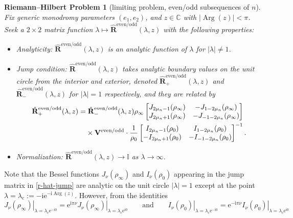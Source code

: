\documentclass[11pt]{article}
\numberwithin{equation}{section}
\numberwithin{equation}{section}
\newtheorem{rhp}[Theorem]{Riemann--Hilbert Problem}
\newcommand{\ee}{\mathrm{e}}
\newcommand{\ii}{\mathrm{i}}
\renewcommand{\arg}{\operatorname{Arg}}
\begin{document}
\begin{rhp}[limiting problem, even/odd subsequences of $n$]
Fix generic monodromy parameters $( e_1, e_2)$, and $z\in\mathbb{C}$ with $|{\arg}(z)|<\pi$. Seek a $2\times 2$ matrix function $\lambda\mapsto\hat{\mathbf{R}}^\mathrm{even/odd}(\lambda,z)$ with the following properties:
\begin{itemize}\itemsep=0pt
 \item Analyticity: $\hat{\mathbf{R}}^\mathrm{even/odd}(\lambda,z)$ is an analytic function of $\lambda$ for $|\lambda|\neq 1$.
 \item Jump condition:
 $\hat{\mathbf{R}}^\mathrm{even/odd}(\lambda,z)$ takes analytic boundary values on the unit circle from the interior and exterior, denoted $\hat{\mathbf{R}}^\mathrm{even/odd}_+(\lambda,z)$ and $\hat{\mathbf{R}}^\mathrm{even/odd}_-(\lambda,z)$ for $|\lambda|=1$ respectively, and they are related by
 \begin{align}
 &\hat{\mathbf{R}}^\mathrm{even/odd}_+(\lambda,z)=\hat{\mathbf{R}}^\mathrm{even/odd}_-(\lambda,z) {\rho_\infty}\begin{bmatrix}J_{2\mu_n - 1}(\rho_\infty) & -J_{1- 2\mu_n}(\rho_\infty)\\
 J_{2\mu_n +1}(\rho_\infty) & -J_{-1-2\mu_n}(\rho_\infty)\end{bmatrix}\nonumber\\
 & \hphantom{\hat{\mathbf{R}}^\mathrm{even/odd}_+(\lambda,z)=}{}
 \times\mathbf{V}^\mathrm{even/odd}
 \cdot \dfrac{1}{\rho_0}\begin{bmatrix}I_{2\mu_n - 1}(\rho_0) & I_{1- 2\mu_n}(\rho_0)\\
 -I_{2\mu_n +1}(\rho_0) & -I_{-1-2\mu_n}(\rho_0)\end{bmatrix}^{-1}.\label{r-hat-jump}
 \end{align}
 \item Normalization:
 $\hat{\mathbf{R}}^\mathrm{even/odd}(\lambda,z)\to\mathbb{I}$ as $\lambda\to\infty$.
\end{itemize}
\label{rhp:Rhat-even/odd}
\end{rhp}
Note that the Bessel functions $J_\nu(\rho_\infty)$ and $I_\nu(\rho_0)$ appearing in the jump matrix in \eqref{r-hat-jump} are analytic on the unit circle $|\lambda|=1$ except at the point $\lambda=\lambda_\mathrm{c}:=-\ii\ee^{-\ii\arg(z)}$. However, from the identities
\[
\left.J_\nu(\rho_\infty)\right|_{\lambda=\lambda_\mathrm{c}\ee^{-\ii 0}}=\ee^{\ii\pi\nu}\left.J_\nu(\rho_\infty)\right|_{\lambda=\lambda_\mathrm{c}\ee^{\ii 0}} \qquad \text{and} \qquad
\left.I_\nu(\rho_0)\right|_{\lambda=\lambda_\mathrm{c}\ee^{-\ii 0}}=\ee^{-\ii\pi\nu}\left.I_\nu(\rho_0)\right|_{\lambda=\lambda_\mathrm{c}\ee^{\ii 0}}
\]
\end{document}
